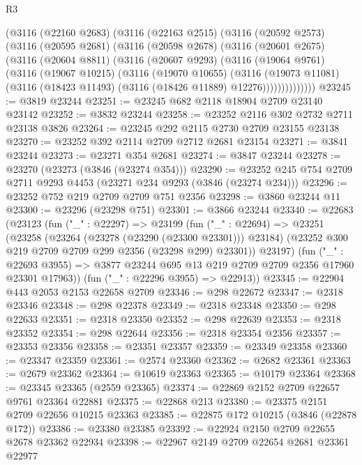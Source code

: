 \begin{lexlean}{R3}
\begin{coremodule}
    (@3116
      (@22160 @2683)
      (@3116
        (@22163 @2515)
        (@3116
          (@20592 @2573)
          (@3116
            (@20595 @2681)
            (@3116
              (@20598 @2678)
              (@3116
                (@20601 @2675)
                (@3116
                  (@20604 @8811)
                  (@3116
                    (@20607 @9293)
                    (@3116
                      (@19064 @9761)
                      (@3116
                        (@19067 @10215)
                        (@3116
                          (@19070 @10655)
                          (@3116
                            (@19073 @11081)
                            (@3116 (@18423 @11493) (@3116 (@18426 @11889) @12276))))))))))))))
@23245 := @3819 @23244
@23251 := @23245 @682 @2118 @18904 @2709 @23140 @23142
@23252 := @3832 @23244
@23258 := @23252 @2116 @302 @2732 @2711 @23138 @3826
@23264 := @23245 @292 @2115 @2730 @2709 @23155 @23138
@23270 := @23252 @392 @2114 @2709 @2712 @2681 @23154
@23271 := @3841 @23244
@23273 := @23271 @354 @2681
@23274 := @3847 @23244
@23278 := @23270 (@23273 (@3846 (@23274 @354)))
@23290 := @23252 @245 @754 @2709 @2711 @9293 @4453 (@23271 @234 @9293 (@3846 (@23274 @234)))
@23296 := @23252 @752 @219 @2709 @2709 @751 @2356
@23298 := @3860 @23244 @11
@23300 := @23296 (@23298 @751)
@23301 := @3866 @23244
@23340 := @22683
    (@23123
      (fun ("_" : @22297) =>
      @23199
        (fun ("_" : @22694) =>
        @23251
          (@23258
            (@23264 (@23278 (@23290 (@23300 @23301))) @23184)
            (@23252 @300 @219 @2709 @2709 @299 @2356 (@23298 @299) @23301))
          @23197)
        (fun ("_" : @22693 @3955) =>
        @3877 @23244 @695 @13 @219 @2709 @2709 @2356 @17960 @23301 @17963))
      (fun ("_" : @22296 @3955) => @22913))
@23345 := @22904 @443 @2053 @2153 @22658 @2709
@23346 := @298 @22672
@23347 := @2318 @23346
@23348 := @298 @22378
@23349 := @2318 @23348
@23350 := @298 @22633
@23351 := @2318 @23350
@23352 := @298 @22639
@23353 := @2318 @23352
@23354 := @298 @22644
@23356 := @2318 @23354 @2356
@23357 := @23353 @23356
@23358 := @23351 @23357
@23359 := @23349 @23358
@23360 := @23347 @23359
@23361 := @2574 @23360
@23362 := @2682 @23361
@23363 := @2679 @23362
@23364 := @10619 @23363
@23365 := @10179 @23364
@23368 := @23345 @23365 (@2559 @23365)
@23374 := @22869 @2152 @2709 @22657 @9761 @23364 @22881
@23375 := @22868 @213
@23380 := @23375 @2151 @2709 @22656 @10215 @23363
@23385 := @22875 @172 @10215 (@3846 (@22878 @172))
@23386 := @23380 @23385
@23392 := @22924 @2150 @2709 @22655 @2678 @23362 @22934
@23398 := @22967 @2149 @2709 @22654 @2681 @23361 @22977

\end{coremodule}
\end{lexlean}
